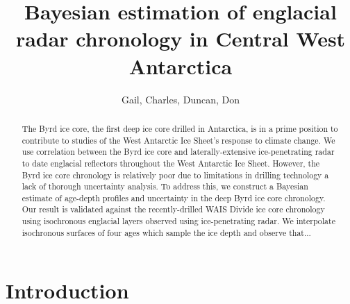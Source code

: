 \documentclass[letterpaper]{igs}
\begin{document}
\title{Bayesian estimation of englacial radar chronology in Central West Antarctica}
\author{Gail, Charles, Duncan, Don}
\maketitle

\begin{abstract}

The Byrd ice core, the first deep ice core drilled in Antarctica, is in a prime position to contribute to studies of the West Antarctic Ice Sheet's response to climate change. We use correlation between the Byrd ice core and laterally-extensive ice-penetrating radar to date englacial reflectors throughout the West Antarctic Ice Sheet. However, the Byrd ice core chronology is relatively poor due to limitations in drilling technology a lack of thorough uncertainty analysis. To address this, we construct a Bayesian estimate of age-depth profiles and uncertainty in the deep Byrd ice core chronology. Our result is validated against the recently-drilled WAIS Divide ice core chronology using isochronous englacial layers observed using ice-penetrating radar. We interpolate isochronous surfaces of four ages which sample the ice depth and observe that...

\end{abstract}
%

\section{Introduction}\label{intro}
	
	
\end{document}
